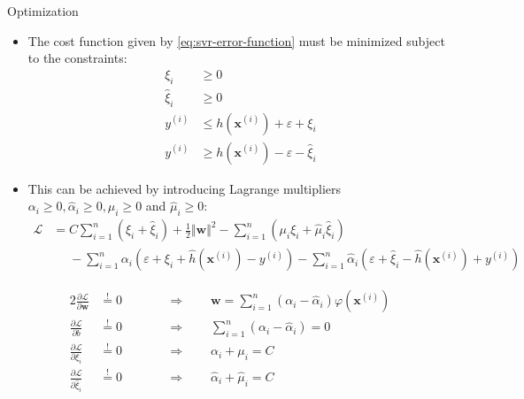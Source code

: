 \begin{dwHeaderFrame}{Optimization}
	\begin{itemize}
		\item The cost function given by \cref{eq:svr-error-function} must be minimized subject to the constraints:
		\begin{align}
			\xi_i 			&\ge 0 							\\
			\widehat{\xi}_i 	&\ge 0 							\\
			y^{(i)} 		&\le h(\bm{x}^{(i)}) + \varepsilon + \xi_i 	\\
			y^{(i)} 		&\ge h(\bm{x}^{(i)}) - \varepsilon - \widehat{\xi}_i
		\end{align}
		\item This can be achieved by introducing Lagrange multipliers $\alpha_i \ge 0, \widehat{\alpha}_i \ge 0, \mu_i \ge 0$ and $\widehat{\mu}_i \ge 0$:
		\begin{align}
			\nonumber
			\mathcal{L}
				&= C \sum_{i=1}^n (\xi_i + \widehat{\xi}_i) + \frac{1}{2} \Vert \bm{w} \Vert^2 - \sum_{i=1}^n (\mu_i \xi_i + \widehat{\mu}_i \widehat{\xi}_i) \\
				&\phantom{=} - \sum_{i=1}^n \alpha_i (\varepsilon + \xi_i + \widehat{h}(\bm{x}^{(i)}) - y^{(i)}) -
					\sum_{i=1}^n \widehat{\alpha}_i (\varepsilon + \widehat{\xi}_i - \widehat{h}(\bm{x}^{(i)}) + y^{(i)})
		\end{align}
	\end{itemize}
\end{dwHeaderFrame}


\begin{frame}
	\begin{alignat}{2}
		\frac{\partial\mathcal{L}}{\partial \bm{w}} 		&\overset{!}{=} 0 \qquad &&\Rightarrow \qquad \bm{w} = \sum_{i=1}^n (\alpha_i - \widehat{\alpha}_i) \varphi(\bm{x}^{(i)})
		\label{eq:derivative-w}																													\\[3mm]
		\frac{\partial\mathcal{L}}{\partial b} 			&\overset{!}{=} 0 \qquad &&\Rightarrow \qquad \sum_{i=1}^n (\alpha_i - \widehat{\alpha}_i) = 0 						\\[3mm]
		\frac{\partial\mathcal{L}}{\partial \xi_i} 			&\overset{!}{=} 0 \qquad &&\Rightarrow \qquad \alpha_i + \mu_i = C
		\label{eq:derivative-xi}																													\\[3mm]
		\frac{\partial\mathcal{L}}{\partial \widehat{\xi}_i} 	&\overset{!}{=} 0 \qquad &&\Rightarrow \qquad \widehat{\alpha}_i + \widehat{\mu}_i = C
		\label{eq:derivative-xi-hat}
	\end{alignat}

\end{frame}


